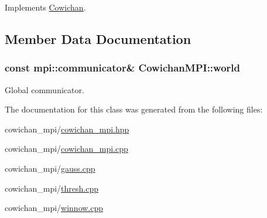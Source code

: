 Implements \hyperlink{class_cowichan_13d60e06ced3b5da79d62c133ce82337}{Cowichan}.

\subsection{Member Data Documentation}
\hypertarget{class_cowichan_m_p_i_cf8ae701dfbb7c17dcec165800c16969}{
\subsubsection[{world}]{\setlength{\rightskip}{0pt plus 5cm}const mpi::communicator\& {\bf CowichanMPI::world}}}
\label{class_cowichan_m_p_i_cf8ae701dfbb7c17dcec165800c16969}


Global communicator. 

The documentation for this class was generated from the following files:\begin{CompactItemize}
\item 
cowichan\_\-mpi/\hyperlink{cowichan__mpi_8hpp}{cowichan\_\-mpi.hpp}\item 
cowichan\_\-mpi/\hyperlink{cowichan__mpi_8cpp}{cowichan\_\-mpi.cpp}\item 
cowichan\_\-mpi/\hyperlink{cowichan__mpi_2gauss_8cpp}{gauss.cpp}\item 
cowichan\_\-mpi/\hyperlink{cowichan__mpi_2thresh_8cpp}{thresh.cpp}\item 
cowichan\_\-mpi/\hyperlink{cowichan__mpi_2winnow_8cpp}{winnow.cpp}\end{CompactItemize}

